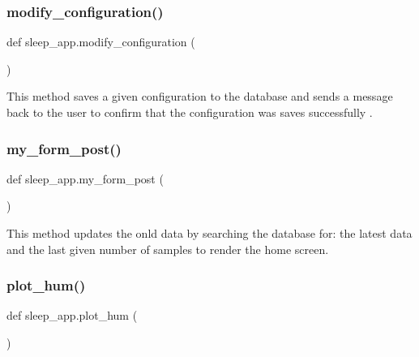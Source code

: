 \mbox{\label{namespacesleep__app_a0ddb2183d8ac02c3105ae375d4122f6a}} 
\subsubsection{\texorpdfstring{modify\+\_\+configuration()}{modify\_configuration()}}
{\footnotesize\ttfamily def sleep\+\_\+app.\+modify\+\_\+configuration (\begin{DoxyParamCaption}{ }\end{DoxyParamCaption})}



This method saves a given configuration to the database and sends a message back to the user to confirm that the configuration was saves successfully . 

\mbox{\label{namespacesleep__app_ae8191a45b113c7edb32a779efa12a392}} 
\subsubsection{\texorpdfstring{my\+\_\+form\+\_\+post()}{my\_form\_post()}}
{\footnotesize\ttfamily def sleep\+\_\+app.\+my\+\_\+form\+\_\+post (\begin{DoxyParamCaption}{ }\end{DoxyParamCaption})}



This method updates the onld data by searching the database for\+: the latest data and the last given number of samples to render the home screen. 

\mbox{\label{namespacesleep__app_a8ca94cb4379eb59bf0e3c8f6946c323b}} 
\subsubsection{\texorpdfstring{plot\+\_\+hum()}{plot\_hum()}}
{\footnotesize\ttfamily def sleep\+\_\+app.\+plot\+\_\+hum (\begin{DoxyParamCaption}{ }\end{DoxyParamCaption})}



